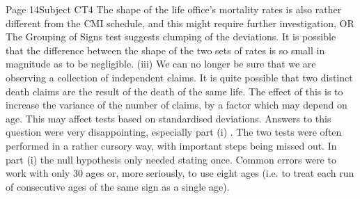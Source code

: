 Page 14Subject CT4 %
The shape of the life office’s mortality rates is also rather different from the CMI
schedule, and this might require further investigation,
OR
The Grouping of Signs test suggests clumping of the deviations.
It is possible that the difference between the shape of the two sets of rates is so small
in magnitude as to be negligible.
(iii)
We can no longer be sure that we are observing a collection of independent claims.
It is quite possible that two distinct death claims are the result of the death of the same
life.
The effect of this is to increase the variance of the number of claims,
by a factor which may depend on age.
This may affect tests based on standardised deviations.
Answers to this question were very disappointing, especially part (i) . The two tests were
often performed in a rather cursory way, with important steps being missed out. In part (i)
the null hypothesis only needed stating once. Common errors were to work with only 30 ages
or, more seriously, to use eight ages (i.e. to treat each run of consecutive ages of the same
sign as a single age).

